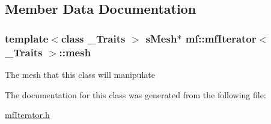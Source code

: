\subsection{Member Data Documentation}
\hypertarget{classmf_1_1mfIterator_a605ced32b4a7f8a90a3cc947d9cd431b}{
\subsubsection[{mesh}]{\setlength{\rightskip}{0pt plus 5cm}template$<$class \_\-Traits $>$ {\bf sMesh}$\ast$ {\bf mf::mfIterator}$<$ \_\-Traits $>$::{\bf mesh}}}
\label{classmf_1_1mfIterator_a605ced32b4a7f8a90a3cc947d9cd431b}
The mesh that this class will manipulate 

The documentation for this class was generated from the following file:\begin{DoxyCompactItemize}
\item 
\hyperlink{mfIterator_8h}{mfIterator.h}\end{DoxyCompactItemize}
